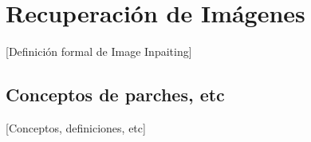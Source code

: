 \chapter{Recuperaci\'on de Imágenes}\label{chapter:II} %
[Definición formal de Image Inpaiting]

\section{Conceptos de parches, etc}
[Conceptos, definiciones, etc]

%	


